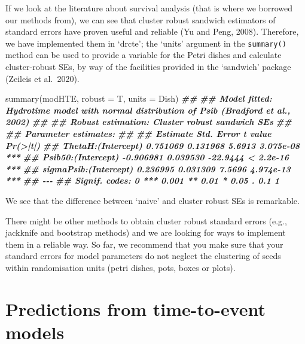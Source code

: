 \documentclass[
]{book}
\newenvironment{Shaded}{\begin{snugshade}}{\end{snugshade}}
\newcommand{\AttributeTok}[1]{\textcolor[rgb]{0.77,0.63,0.00}{#1}}
\newcommand{\DocumentationTok}[1]{\textcolor[rgb]{0.56,0.35,0.01}{\textbf{\textit{#1}}}}
\newcommand{\FunctionTok}[1]{\textcolor[rgb]{0.00,0.00,0.00}{#1}}
\newcommand{\NormalTok}[1]{#1}
\begin{document}
If we look at the literature about survival analysis (that is where we borrowed our methods from), we can see that cluster robust sandwich estimators of standard errors have proven useful and reliable (Yu and Peng, 2008). Therefore, we have implemented them in `drcte'; the `units' argument in the \texttt{summary()} method can be used to provide a variable for the Petri dishes and calculate cluster-robust SEs, by way of the facilities provided in the `sandwich' package (Zeileis et al.~2020).

\begin{Shaded}
\begin{Highlighting}[]
\FunctionTok{summary}\NormalTok{(modHTE, }\AttributeTok{robust =}\NormalTok{ T, }\AttributeTok{units =}\NormalTok{ Dish)}
\DocumentationTok{\#\# }
\DocumentationTok{\#\# Model fitted: Hydrotime model with normal distribution of Psib (Bradford et al., 2002)}
\DocumentationTok{\#\# }
\DocumentationTok{\#\# Robust estimation: Cluster robust sandwich SEs }
\DocumentationTok{\#\# }
\DocumentationTok{\#\# Parameter estimates:}
\DocumentationTok{\#\# }
\DocumentationTok{\#\#                        Estimate Std. Error  t value  Pr(\textgreater{}|t|)    }
\DocumentationTok{\#\# ThetaH:(Intercept)     0.751069   0.131968   5.6913 3.075e{-}08 ***}
\DocumentationTok{\#\# Psib50:(Intercept)    {-}0.906981   0.039530 {-}22.9444 \textless{} 2.2e{-}16 ***}
\DocumentationTok{\#\# sigmaPsib:(Intercept)  0.236995   0.031309   7.5696 4.974e{-}13 ***}
\DocumentationTok{\#\# {-}{-}{-}}
\DocumentationTok{\#\# Signif. codes:  0 \textquotesingle{}***\textquotesingle{} 0.001 \textquotesingle{}**\textquotesingle{} 0.01 \textquotesingle{}*\textquotesingle{} 0.05 \textquotesingle{}.\textquotesingle{} 0.1 \textquotesingle{} \textquotesingle{} 1}
\end{Highlighting}
\end{Shaded}

We see that the difference between `naive' and cluster robust SEs is remarkable.

There might be other methods to obtain cluster robust standard errors (e.g., jackknife and bootstrap methods) and we are looking for ways to implement them in a reliable way. So far, we recommend that you make sure that your standard errors for model parameters do not neglect the clustering of seeds within randomisation units (petri dishes, pots, boxes or plots).

\hypertarget{predictions-from-time-to-event-models}{%
\chapter{Predictions from time-to-event models}\label{predictions-from-time-to-event-models}}
\end{document}
